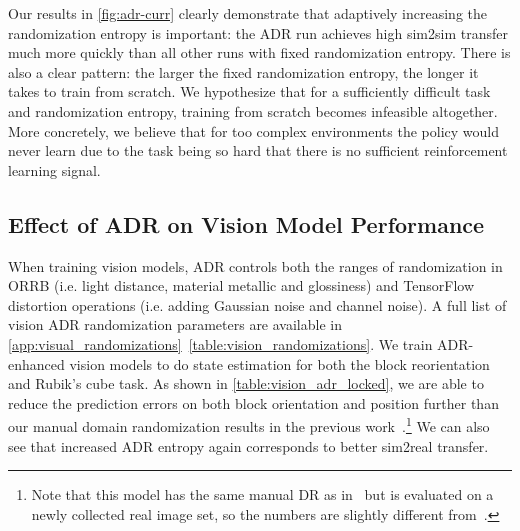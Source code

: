Our results in \autoref{fig:adr-curr} clearly demonstrate that adaptively increasing the randomization entropy is important: the ADR run achieves high sim2sim transfer much more quickly than all other runs with fixed randomization entropy. There is also a clear pattern: the larger the fixed randomization entropy, the longer it takes to train from scratch. We hypothesize that for a sufficiently difficult task and randomization entropy, training from scratch becomes infeasible altogether. More concretely, we believe that for too complex environments the policy would never learn due to the task being so hard that there is no sufficient reinforcement learning signal.



\subsection{Effect of ADR on Vision Model Performance}
\label{sec:result-vision}

When training vision models, ADR controls both the ranges of randomization in ORRB (i.e. light distance, material metallic and glossiness) and TensorFlow distortion operations (i.e. adding Gaussian noise and channel noise). A full list of vision ADR randomization parameters are available in \autoref{app:visual_randomizations}~\autoref{table:vision_randomizations}. We train ADR-enhanced vision models to do state estimation for both the block reorientation~\cite{openai2018learning} and Rubik's cube task. 
As shown in \autoref{table:vision_adr_locked}, we are able to reduce the prediction errors on both block orientation and position further than our manual domain randomization results in the previous work~\cite{openai2018learning}.\footnote{Note that this model has the same manual DR as in~\cite{openai2018learning} but is evaluated on a newly collected real image set, so the numbers are slightly different from~\cite{openai2018learning}.} We can also see that increased ADR entropy again corresponds to better sim2real transfer.

